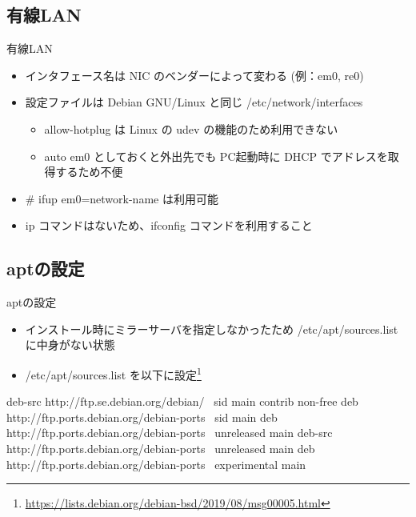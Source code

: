 \subsection{有線LAN}
\begin{frame}{有線LAN}
  \begin{itemize}
  \item インタフェース名は NIC のベンダーによって変わる (例：em0, re0)
  \item 設定ファイルは Debian GNU/Linux と同じ /etc/network/interfaces
    \begin{itemize}
    \item allow-hotplug は Linux の udev の機能のため利用できない
    \item auto em0 としておくと外出先でも PC起動時に DHCP でアドレスを取得するため不便
    \end{itemize}
  \item \# ifup em0={network-name} は利用可能
  \item ip コマンドはないため、ifconfig コマンドを利用すること
  \end{itemize}
\end{frame}

\subsection{aptの設定}
\begin{frame}[containsverbatim]{aptの設定}

\begin{itemize}
\item インストール時にミラーサーバを指定しなかったため /etc/apt/sources.list に中身がない状態
\item /etc/apt/sources.list を以下に設定\footnote{\url{https://lists.debian.org/debian-bsd/2019/08/msg00005.html}}
\end{itemize}

\begin{commandlinesmall}
deb-src http://ftp.se.debian.org/debian/ \
    sid main contrib non-free
deb http://ftp.ports.debian.org/debian-ports \
    sid main
deb http://ftp.ports.debian.org/debian-ports \
    unreleased main
deb-src http://ftp.ports.debian.org/debian-ports \
    unreleased main
deb http://ftp.ports.debian.org/debian-ports \
    experimental main
\end{commandlinesmall}
\end{frame}

